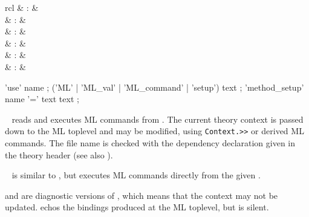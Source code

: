 \begin{isabellebody}
\begin{isamarkuptext}
\begin{descr}
  \end{descr}%
\end{isamarkuptext}%
\isamarkuptrue%
%
\isamarkuptrue%
%
\begin{isamarkuptext}%
\begin{matharray}{rcl}
     & : &  \\
     & : &  \\
     & : & \isartrans{\cdot}{\cdot} \\
     & : & \isartrans{\cdot}{\cdot} \\
     & : &  \\
     & : &  \\
  \end{matharray}

  \begin{rail}
    'use' name
    ;
    ('ML' | 'ML\_val' | 'ML\_command' | 'setup') text
    ;
    'method\_setup' name '=' text text
    ;
  \end{rail}

  \begin{descr}

  \item [\isa{\isacommand{use}}~\isa{file}] reads and executes ML
  commands from .  The current theory context is passed
  down to the ML toplevel and may be modified, using \verb|Context.>>| or derived ML commands.  The file name is checked with
  the  dependency declaration given in the theory
  header (see also ).
  
  \item [\isa{\isacommand{ML}}~\isa{text}] is similar to , but executes ML commands directly from the given .

  \item [\isa{\isacommand{ML{\isacharunderscore}val}} and \isa{\isacommand{ML{\isacharunderscore}command}}] are
  diagnostic versions of , which means that the context
  may not be updated.   echos the bindings produced
  at the ML toplevel, but  is silent.
  

\end{descr}
\end{isamarkuptext}
\end{isabellebody}
